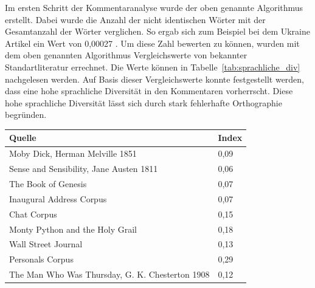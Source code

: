 \documentclass[12pt,a4paper,oneside]{article}
\begin{document}
\begin{titlepage}
\begin{flushleft}

Im ersten Schritt der Kommentaranalyse wurde der oben genannte Algorithmus erstellt. Dabei wurde die Anzahl der nicht identischen Wörter mit der Gesamtanzahl der Wörter verglichen. So ergab sich zum Beispiel bei dem Ukraine Artikel ein Wert von 0,00027 \cite{Greven2014Zeit}. Um diese Zahl bewerten zu können, wurden mit dem oben genannten Algorithmus Vergleichswerte von bekannter Standartliteratur errechnet. Die Werte können in Tabelle~\ref{tab:sprachliche_div} nachgelesen werden. Auf Basis dieser Vergleichswerte konnte festgestellt werden, dass eine hohe sprachliche Diversität in den Kommentaren vorherrscht. Diese hohe sprachliche Diversität lässt sich durch stark fehlerhafte Orthographie begründen.


\begin{singlespace}
\label{tab:sprachliche_div}
\noindent\begin{tabularx}{.90\textwidth}{l|l} %
    \hline
    \textbf{Quelle} & \textbf{Index}  \\ \hline 
Moby Dick, Herman Melville 1851                                                               & 0,09             \\
Sense and Sensibility, Jane Austen 1811                                                       & 0,06             \\
The Book of Genesis                                                                             & 0,07             \\
Inaugural Address Corpus                                                                        & 0,07             \\
Chat Corpus                                                                                     & 0,15             \\
Monty Python and the Holy Grail                                                                 & 0,18             \\
Wall Street Journal                                                                             & 0,13             \\
Personals Corpus                                                                                & 0,29             \\
The Man Who Was Thursday, G. K. Chesterton 1908                                             & 0,12             \\
\end{tabularx}


\end{singlespace}
\end{flushleft}
\end{titlepage}
\end{document}
